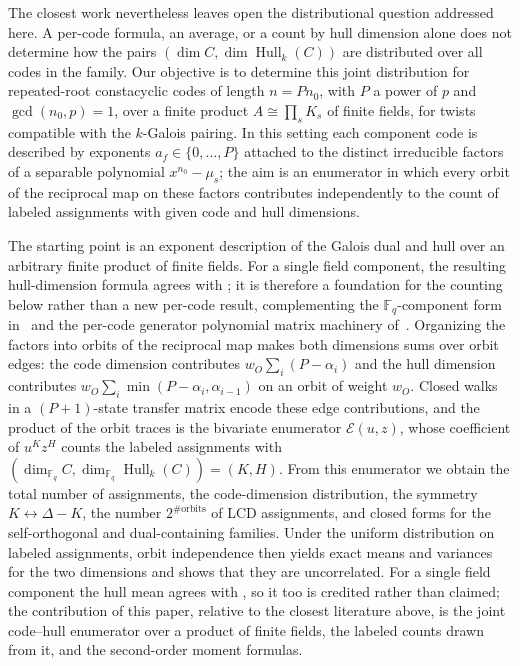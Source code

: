 \documentclass[10pt,journal,draftclsnofoot,onecolumn]{IEEEtran}
\theoremstyle{definition}
\theoremstyle{remark}
\newcommand{\Fq}{\mathbb{F}_q}
\newcommand{\Hull}{\operatorname{Hull}}
\begin{document}
The closest work nevertheless leaves open the distributional question
addressed here. A per-code formula, an average, or a count by hull
dimension alone does not determine how the pairs
\((\dim C, \dim \Hull_k(C))\) are distributed over all codes in the
family. Our objective is to determine this joint distribution for
repeated-root constacyclic codes of length \(n = P n_0\), with \(P\)
a power of \(p\) and \(\gcd(n_0,p)=1\), over a finite product
\(A \cong \prod_s K_s\) of finite fields, for twists compatible with
the \(k\)-Galois pairing. In this setting each component code is
described by exponents \(a_f \in \{0,\dots,P\}\) attached to the
distinct irreducible factors of a separable polynomial
\(x^{n_0} - \mu_s\); the aim is an enumerator in which every orbit of
the reciprocal map on these factors contributes independently
to the count of labeled assignments with given code and hull
dimensions.

The starting point is an exponent description of the Galois dual and
hull over an arbitrary finite product of finite fields. For a single
field component, the resulting hull-dimension formula agrees with
\cite[Theorem~3]{DPI2023}; it is therefore a foundation for the
counting below rather than a new per-code result, complementing the
\(\Fq\)-component form in~\cite{DIMP2026} and the per-code generator
polynomial matrix machinery of~\cite{ES2026}. Organizing the factors
into orbits of the reciprocal map makes both dimensions sums
over orbit edges: the code dimension contributes
\(w_O \sum_i (P-\alpha_i)\) and the hull dimension contributes
\(w_O \sum_i \min(P-\alpha_i, \alpha_{i-1})\) on an orbit of weight
\(w_O\). Closed walks in a \((P{+}1)\)-state transfer matrix encode
these edge contributions, and the product of the orbit traces is the
bivariate enumerator \(\mathcal{E}(u,z)\), whose coefficient of
\(u^K z^H\) counts the labeled assignments with
\((\dim_{\Fq} C, \dim_{\Fq} \Hull_k(C)) = (K,H)\). From this
enumerator we obtain the total number of assignments, the
code-dimension distribution, the symmetry
\(K \leftrightarrow \Delta - K\), the number
\(2^{\#\mathrm{orbits}}\) of LCD assignments, and closed forms for
the self-orthogonal and dual-containing families. Under the uniform
distribution on labeled assignments, orbit independence then yields
exact means and variances for the two dimensions and shows that they
are uncorrelated. For a single field component the hull mean agrees
with \cite[Theorem~3.3]{DP2025}, so it too is credited rather than
claimed; the contribution of this paper, relative to the closest
literature above, is the joint code--hull enumerator over a product
of finite fields, the labeled counts drawn from it, and the
second-order moment formulas.
\end{document}
